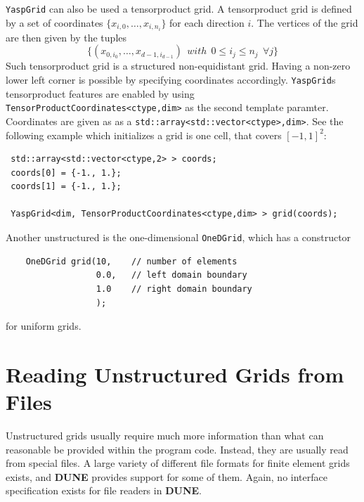 \documentclass[11pt,a4paper,headinclude,footinclude,DIV16,headings=normal]{scrreprt}
\newcommand{\Dune}{{\sffamily\bfseries DUNE}\xspace}
\begin{document}
\lstinline!YaspGrid! can also be used a tensorproduct grid. A tensorproduct grid
is defined by a set of coordinates $\{ x_{i,0}, \dots ,x_{i,n_i}\}$ for each
direction $i$. The vertices of the grid are then given by the tuples
\begin{displaymath}
 \{
  (x_{0,i_0},\dots ,x_{d-1,i_{d-1}})\ \
   with\ \  0\leq i_j\leq n_j \ \ \forall j\}
\end{displaymath}
Such tensorproduct grid is a structured non-equidistant grid. Having a non-zero
lower left corner is possible by specifying coordinates accordingly. \lstinline!YaspGrid!s
tensorproduct features are enabled by using \lstinline!TensorProductCoordinates<ctype,dim>!
as the second template paramter. Coordinates are given as as a \lstinline!std::array<std::vector<ctype>,dim>!.
See the following example which initializes a grid is one cell, that covers $[-1,1]^2$:

\begin{lstlisting}
 std::array<std::vector<ctype,2> > coords;
 coords[0] = {-1., 1.};
 coords[1] = {-1., 1.};

 YaspGrid<dim, TensorProductCoordinates<ctype,dim> > grid(coords);
\end{lstlisting}

Another unstructured is the one-dimensional \lstinline!OneDGrid!, which has a constructor
\begin{lstlisting}
    OneDGrid grid(10,    // number of elements
                  0.0,   // left domain boundary
                  1.0    // right domain boundary
                  );
\end{lstlisting}
for uniform grids.

\section{Reading Unstructured Grids from Files}

Unstructured grids usually require much more information than what can
reasonable be provided within the program code.  Instead, they are usually
read from special files.  A large variety of different file formats for
finite element grids exists, and \Dune provides support for some of them.
Again, no interface specification exists for file readers in \Dune.
\end{document}

